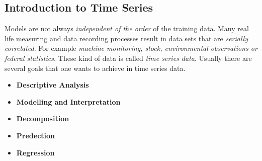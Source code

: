 \subsection{Introduction to Time Series}
Models are not always \textit{independent of the order} of the training data. Many real life measuring and data recording processes result in data sets that are \textit{serially correlated}. For example \textit{machine monitoring, stock, environmental observations or federal statistics.} These kind of data is called \textit{time series data}. Usually there are several goals that one wants to achieve in time series data.
\begin{itemize}
	\item \textbf{Descriptive Analysis}
	\item \textbf{Modelling and Interpretation}
	\item \textbf{Decomposition}
	\item \textbf{Predection}
	\item \textbf{Regression}
\end{itemize}
